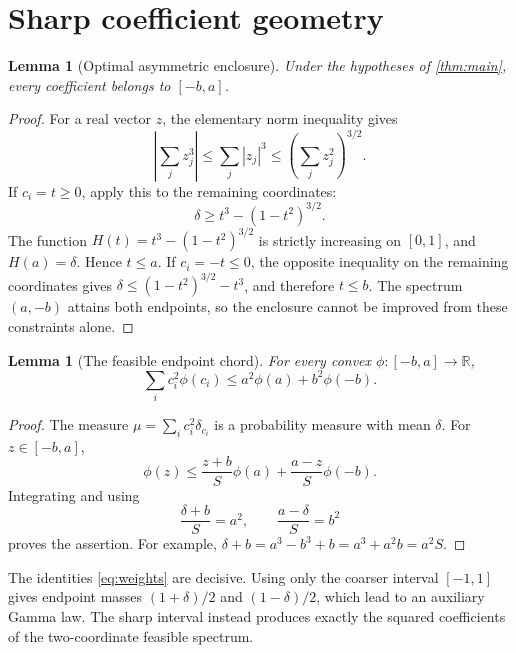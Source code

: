 \documentclass[11pt]{article}
\numberwithin{equation}{section}
\newtheorem{lemma}[theorem]{Lemma}
\theoremstyle{definition}
\theoremstyle{remark}
\newcommand{\R}{\mathbb R}
\begin{document}
\section{Sharp coefficient geometry}
\label{sec:geometry}

\begin{lemma}[Optimal asymmetric enclosure]\label{lem:enclosure}
Under the hypotheses of \cref{thm:main}, every coefficient belongs to $[-b,a]$.
\end{lemma}
\begin{proof}
For a real vector $z$, the elementary norm inequality gives
\[
\left|\sum_j z_j^3\right|\leq \sum_j|z_j|^3
\leq\left(\sum_j z_j^2\right)^{3/2}.
\]
If $c_i=t\geq0$, apply this to the remaining coordinates:
\[
\delta\geq t^3-(1-t^2)^{3/2}.
\]
The function $H(t)=t^3-(1-t^2)^{3/2}$ is strictly increasing on $[0,1]$, and $H(a)=\delta$. Hence $t\leq a$. If $c_i=-t\leq0$, the opposite inequality on the remaining coordinates gives
$\delta\leq(1-t^2)^{3/2}-t^3$, and therefore $t\leq b$. The spectrum $(a,-b)$ attains both endpoints, so the enclosure cannot be improved from these constraints alone.
\end{proof}

\begin{lemma}[The feasible endpoint chord]\label{lem:chord}
For every convex $\phi:[-b,a]\to\R$,
\begin{equation}\label{eq:chord}
\sum_i c_i^2\phi(c_i)\leq a^2\phi(a)+b^2\phi(-b).
\end{equation}
\end{lemma}
\begin{proof}
The measure $\mu=\sum_i c_i^2\delta_{c_i}$ is a probability measure with mean $\delta$. For $z\in[-b,a]$,
\[
\phi(z)\leq\frac{z+b}{S}\phi(a)+\frac{a-z}{S}\phi(-b).
\]
Integrating and using
\begin{equation}\label{eq:weights}
\frac{\delta+b}{S}=a^2,\qquad
\frac{a-\delta}{S}=b^2
\end{equation}
proves the assertion. For example, $\delta+b=a^3-b^3+b=a^3+a^2b=a^2S$.
\end{proof}

The identities \eqref{eq:weights} are decisive. Using only the coarser interval $[-1,1]$ gives endpoint masses $(1+\delta)/2$ and $(1-\delta)/2$, which lead to an auxiliary Gamma law. The sharp interval instead produces exactly the squared coefficients of the two-coordinate feasible spectrum.
\end{document}
